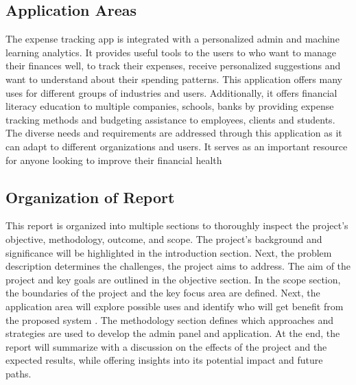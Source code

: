 \documentclass[12pt]{article}
\begin{document}
\vspace{1cm}

\noindent
\subsection{Application Areas}

\vspace{0.5cm}

\normalsize
\noindent The expense tracking app is integrated with a personalized admin and machine learning analytics. It provides useful tools to the users to who want to manage their finances well, to track their expenses, receive personalized suggestions and want to understand about their spending patterns. This application offers many uses for different groups of industries and users.
Additionally, it offers financial literacy education to multiple companies, schools, banks by providing expense tracking methods and budgeting assistance to employees, clients and students. The diverse needs and requirements are addressed through this application as it can adapt to different organizations and users. It serves as an important resource for anyone looking to improve their financial health \cite{sabab2018eexpense}
\vspace{1cm}

\noindent
\subsection{Organization of Report}

\vspace{0.5cm}

\normalsize
\noindent This report is organized into multiple sections to thoroughly inspect the project’s objective, methodology, outcome, and scope. The project’s background and significance will be highlighted in the introduction section. Next, the problem description determines the challenges, the project aims to address. The aim of the project and key goals are outlined in the objective section. In the scope section, the boundaries of the project and the key focus area are defined. Next, the application area will explore possible uses and identify who will get benefit from the proposed system \cite{sabab2018eexpense}. The methodology section defines which approaches and strategies are used to develop the admin panel and application. At the end, the report will summarize with a discussion on the effects of the project and the expected results, while offering insights into its potential impact and future paths. 
\newpage
 
\end{document}
